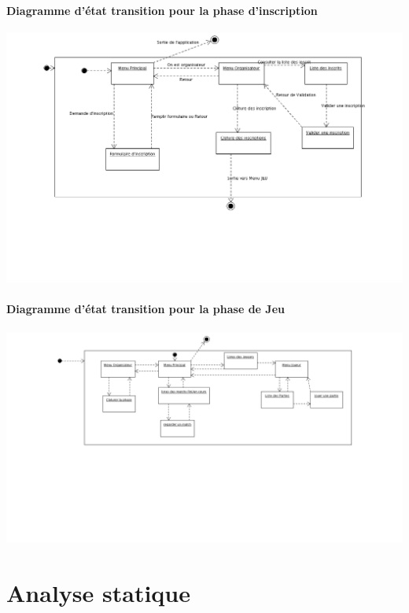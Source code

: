 \documentclass[10pt,a4paper]{report}
\begin{document}
\paragraph{Diagramme d'état transition pour la phase d'inscription}
\begin{center}
\includegraphics[width=17cm]{Etat_transi_Inscr.png}
\end{center}

\paragraph{Diagramme d'état transition pour la phase de Jeu}
\begin{center}
\includegraphics[width=17cm]{Etat_transi_Jeu.png}
\end{center}




\section{Analyse statique}
\paragraph{}
\end{document}
